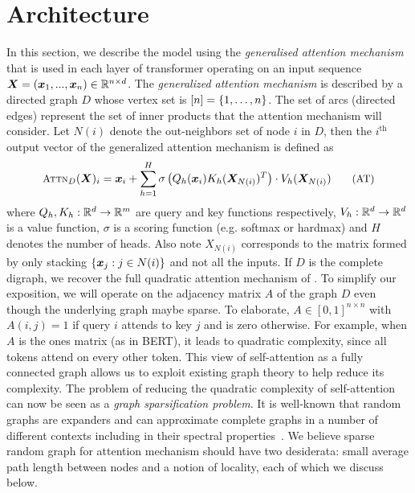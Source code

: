 \section{\bigb Architecture}
\label{sec:arch}
In this section, we describe the \bigb model using the \emph{generalised attention mechanism} that is used in each layer of transformer operating on an input sequence ${\bm{X}} = ({\bm{x}}_1, ..., {\bm{x}}_n) \in \mathbb{R}^{n\times d}$. 
The \emph{generalized attention mechanism} is described by a directed graph $D$ whose vertex set is $[n] = \{1,\dots,n\}$. 
The set of arcs (directed edges) represent the set of inner products that the attention mechanism will consider. 
Let $N(i)$ denote the out-neighbors set of node $i$ in $D$, then the $i^\text{th}$ output vector of the generalized attention mechanism is defined as \useshortskip
\vspace{-1mm}
\begin{equation}\vspace{-2mm}
\small
\Attn_D(\mX)_i = \vx_i +  \sum_{h=1}^H \sigma \left(Q_h(\vx_i) K_h(\mX_{N(i)})^T \right) \cdot V_h(\mX_{N(i)}) %
\label{AT} \tag{AT}
\end{equation}
where $Q_h, K_h:\mathbb{R}^d \to \mathbb{R}^m$ are query and key functions respectively, $V_h:\mathbb{R}^d \to \mathbb{R}^d$ is a value function, $\sigma$ is a scoring function (e.g. softmax or hardmax) and $H$ denotes the number of heads. 
Also note $X_{N(i)}$ corresponds to the matrix formed by only stacking $\{{\bm{x}}_j : j\in N(i) \}$ and not all the inputs. 
If $D$ is the complete digraph, we recover the full quadratic attention mechanism of \citet{vaswani2017attention}. 
To simplify our exposition, we will operate on the adjacency matrix $A$ of the graph $D$  even though the underlying graph maybe sparse.
To elaborate, $A \in [0, 1]^{n \times n}$ with $A(i,j)=1$ if query $i$ attends to key $j$ and is zero otherwise.
For example, when $A$ is the ones matrix (as in BERT), it leads to quadratic complexity, since all tokens attend on every other token.
This view of self-attention as a fully connected graph allows us to exploit existing graph theory to help reduce its complexity. 
The problem of reducing the quadratic complexity of self-attention can now be seen as a \emph{graph sparsification problem}. 
It is well-known that random graphs are expanders and can approximate complete graphs in a number of different contexts including in their spectral properties~\citep{spielman2011spectral,hoory2006expander}.
We believe sparse random graph for attention mechanism should have two desiderata: small average path length between nodes and a notion of locality, each of which we discuss below.

